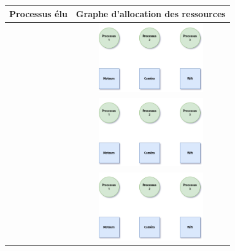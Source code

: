 \documentclass[12pt,a4paper,article,english,firamath]{nsi}
\newcommand{\truc}{4.5cm}
\begin{document}
\begin{center}
\begin{tabular}{|c|c|}
\hline
\rowcolor{UGLiOrange}\textbf{\color{white}Processus élu} & \textbf{\color{white}Graphe d'allocation des ressources} \\
\hline
 & \includegraphics[width=\truc]{img/d6.png} \\
\hline
 & \includegraphics[width=\truc]{img/d6.png} \\
\hline
 & \includegraphics[width=\truc]{img/d6.png} \\

\end{tabular}
\end{center}
\end{document}
